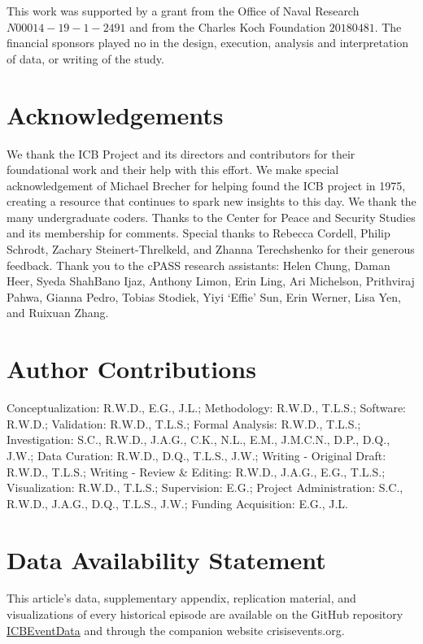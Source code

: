 \documentclass{article}
\begin{document}
This work was supported by a grant from the Office of Naval Research
\(N00014-19-1-2491\) and from the Charles Koch Foundation \(20180481\).
The financial sponsors played no in the design, execution, analysis and
interpretation of data, or writing of the study.

\hypertarget{acknowledgements}{%
\section{Acknowledgements}\label{acknowledgements}}

We thank the ICB Project and its directors and contributors for their
foundational work and their help with this effort. We make special
acknowledgement of Michael Brecher for helping found the ICB project in
1975, creating a resource that continues to spark new insights to this
day. We thank the many undergraduate coders. Thanks to the Center for
Peace and Security Studies and its membership for comments. Special
thanks to Rebecca Cordell, Philip Schrodt, Zachary Steinert-Threlkeld,
and Zhanna Terechshenko for their generous feedback. Thank you to the
cPASS research assistants: Helen Chung, Daman Heer, Syeda ShahBano Ijaz,
Anthony Limon, Erin Ling, Ari Michelson, Prithviraj Pahwa, Gianna Pedro,
Tobias Stodiek, Yiyi `Effie' Sun, Erin Werner, Lisa Yen, and Ruixuan
Zhang.

\hypertarget{author-contributions}{%
\section{Author Contributions}\label{author-contributions}}

Conceptualization: R.W.D., E.G., J.L.; Methodology: R.W.D., T.L.S.;
Software: R.W.D.; Validation: R.W.D., T.L.S.; Formal Analysis: R.W.D.,
T.L.S.; Investigation: S.C., R.W.D., J.A.G., C.K., N.L., E.M., J.M.C.N.,
D.P., D.Q., J.W.; Data Curation: R.W.D., D.Q., T.L.S., J.W.; Writing -
Original Draft: R.W.D., T.L.S.; Writing - Review \& Editing: R.W.D.,
J.A.G., E.G., T.L.S.; Visualization: R.W.D., T.L.S.; Supervision: E.G.;
Project Administration: S.C., R.W.D., J.A.G., D.Q., T.L.S., J.W.;
Funding Acquisition: E.G., J.L.

\hypertarget{data-availability-statement}{%
\section{Data Availability
Statement}\label{data-availability-statement}}

This article's data, supplementary appendix, replication material, and
visualizations of every historical episode are available on the GitHub
repository
\href{https://urldefense.com/v3/__https://github.com/CenterForPeaceAndSecurityStudies/ICBEventData__;!!Mih3wA!WxDJtEczKfxGTh0S2Krunap8ReymFEL5iTWaSfOHeqlSdyfRx77zmjBSWO1OAm13$}{ICBEventData}
and through the companion website crisisevents.org.
\end{document}
